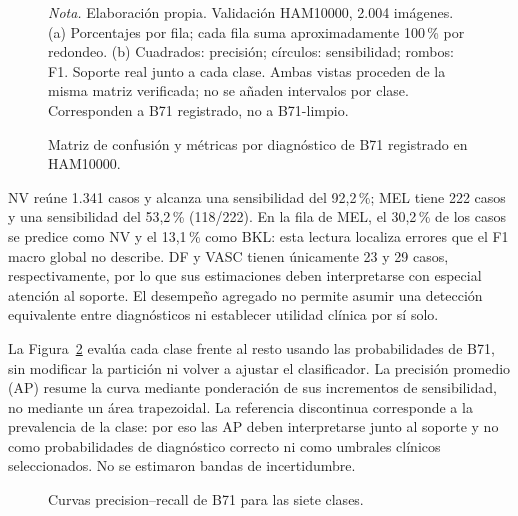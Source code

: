 \begin{figure}[!htbp]
\caption{Matriz de confusión y métricas por diagnóstico de B71 registrado en HAM10000.}
\label{fig:errores-b71-integrados}
\label{fig:confusion-b71-ham}
\label{fig:metricas-clase-b71}
\centering

\par\smallskip
{\singlespacing\fontsize{11}{13}\selectfont\raggedright
\noindent\textit{Nota.} Elaboración propia. Validación HAM10000, 2.004 imágenes. (a) Porcentajes por fila; cada fila suma aproximadamente 100\,\% por redondeo. (b) Cuadrados: precisión; círculos: sensibilidad; rombos: F1. Soporte real junto a cada clase. Ambas vistas proceden de la misma matriz verificada; no se añaden intervalos por clase. Corresponden a B71 registrado, no a B71-limpio.\par}
\end{figure}
\FloatBarrier

NV reúne 1.341 casos y alcanza una sensibilidad del 92,2\,\%; MEL tiene 222 casos y una sensibilidad del 53,2\,\% (118/222). En la fila de MEL, el 30,2\,\% de los casos se predice como NV y el 13,1\,\% como BKL: esta lectura localiza errores que el F1 macro global no describe. DF y VASC tienen únicamente 23 y 29 casos, respectivamente, por lo que sus estimaciones deben interpretarse con especial atención al soporte. El desempeño agregado no permite asumir una detección equivalente entre diagnósticos ni establecer utilidad clínica por sí solo.

La Figura~\ref{fig:precision-recall-b71} evalúa cada clase frente al resto usando las probabilidades de B71, sin modificar la partición ni volver a ajustar el clasificador. La precisión promedio (AP) resume la curva mediante ponderación de sus incrementos de sensibilidad, no mediante un área trapezoidal. La referencia discontinua corresponde a la prevalencia de la clase: por eso las AP deben interpretarse junto al soporte y no como probabilidades de diagnóstico correcto ni como umbrales clínicos seleccionados. No se estimaron bandas de incertidumbre.

\begin{figure}[!htbp]
\caption{Curvas precision--recall de B71 para las siete clases.}
\label{fig:precision-recall-b71}
\centering
\noindent\makebox[\linewidth][c]{}
\par\smallskip
\raggedright\fontsize{11}{13}\selectfont\singlespacing
\par{}
\end{figure}

